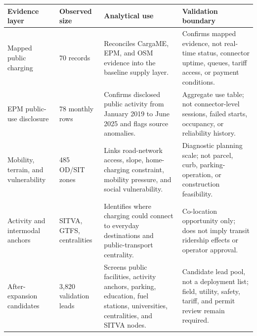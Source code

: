 \begin{tabularx}{\textwidth}{p{}p{}XX}
\toprule
Evidence layer & Observed size & Analytical use & Validation boundary \\
\midrule
Mapped public charging & 70 records & Reconciles CargaME, EPM, and OSM evidence into the baseline supply layer. & Confirms mapped evidence, not real-time status, connector uptime, queues, tariff access, or payment conditions. \\
EPM public-use disclosure & 78 monthly rows & Confirms disclosed public activity from January 2019 to June 2025 and flags source anomalies. & Aggregate use table; not connector-level sessions, failed starts, occupancy, or reliability history. \\
Mobility, terrain, and vulnerability & 485 OD/SIT zones & Links road-network access, slope, home-charging constraint, mobility pressure, and social vulnerability. & Diagnostic planning scale; not parcel, curb, parking-operation, or construction feasibility. \\
Activity and intermodal anchors & SITVA, GTFS, centralities & Identifies where charging could connect to everyday destinations and public-transport centrality. & Co-location opportunity only; does not imply transit ridership effects or operator approval. \\
After-expansion candidates & 3,820 validation leads & Screens public facilities, activity anchors, parking, education, fuel stations, universities, centralities, and SITVA nodes. & Candidate lead pool, not a deployment list; field, utility, safety, tariff, and permit review remain required. \\
\bottomrule
\end{tabularx}
